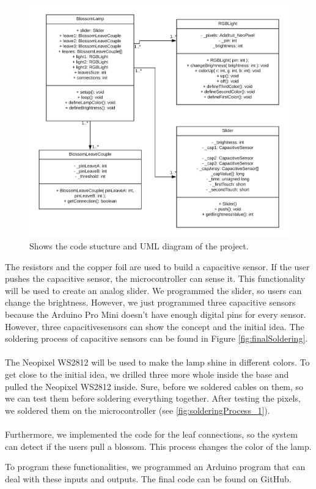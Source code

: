 \documentclass[04_projectProcess.tex]{subfiles}
\begin{document}
\begin{flushleft}
        \begin{figure}[H]
            \centering
            \includegraphics[width=0.8\linewidth]{images/programmingProcess/BlossomLamp_UML.png}
            \caption{Shows the code stucture and UML diagram of the project.}
            \label{fig:UMLDiagram}
        \end{figure}

        \noindent
        The resistors and the copper foil are used to build a capacitive sensor. \cite{Badger2019} 
        If the user pushes the capacitive sensor, the microcontroller can sense it. This functionality
        will be used to create an analog slider. We programmed the slider, so users can change the 
        brightness. However, we just programmed three capacitive sensors because the Arduino Pro Mini 
        doesn't have enough digital pins for every sensor. However, three capacitivesensors can show 
        the concept and the initial idea. The soldering process of capacitive sensors can be found in 
        Figure \ref{fig:finalSoldering}. \\~\\

        \noindent
        The Neopixel WS2812 will be used to make the lamp shine in different colors. \cite{Burgess2019} 
        To get close to the initial idea, we drilled three more whole inside the base and 
        pulled the Neopixel WS2812 inside. Sure, before we soldered cables on them, so we can 
        test them before soldering everything together. After testing the pixels, we soldered 
        them on the microcontroller (see \ref{fig:solderingProcess_1}).\\~\\

        \noindent
        Furthermore, we implemented the code for the leaf connections, so the system can detect if 
        the users pull a blossom. This process changes the color of the lamp.

        \noindent
        To program these functionalities, we programmed an Arduino program that can deal with these inputs 
        and outputs. The final code can be found on GitHub. %
    \end{flushleft}
\end{document}
